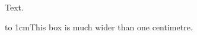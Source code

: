 \documentclass{article}
\begin{document}
Text.

\hbox to 1cm{This box is much wider than one centimetre.}
\end{document}
